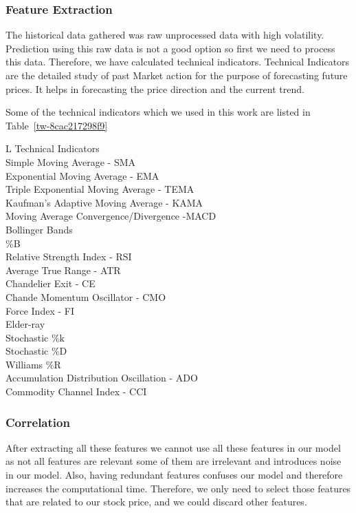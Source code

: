 \documentclass[5p,,preprint,12pt,twocolumn]{elsarticle}
\def\tblbottomrule{\noalign{\vspace*{6pt}}\hline\noalign{\vspace*{2pt}}}
\def\tblmidrule{\noalign{\vspace*{6pt}}\hline\noalign{\vspace*{2pt}}}
\begin{document}
\subsubsection{Feature Extraction}The historical data gathered was raw unprocessed data with high volatility. Prediction using this raw data is not a good option so first we need to process this data. Therefore, we have calculated technical indicators. Technical Indicators are the detailed study of past Market action for the purpose of forecasting future prices. It helps in forecasting the price direction and the current trend.

Some of the technical indicators which we used in this work are listed in Table~\ref{tw-8cac217298f9}
\begin{table}[!htbp]
\caption{{Technical Indicators} }
\label{tw-8cac217298f9}
\def\arraystretch{1}
\ignorespaces 
\centering 
\begin{tabulary}{\linewidth}{L}
\hline 
Technical Indicators\\
\tblmidrule 
Simple Moving Average - SMA\\
Exponential Moving Average - EMA\\
Triple Exponential Moving Average - TEMA\\
Kaufman's Adaptive Moving Average - KAMA\\
Moving Average Convergence/Divergence -MACD\\
Bollinger Bands\\
\%B\\
Relative Strength Index - RSI \\
 Average True Range - ATR\\
Chandelier Exit - CE\\
Chande Momentum Oscillator - CMO\\
Force Index - FI\\
Elder-ray\\
Stochastic \%k\\
Stochastic \%D\\
Williams \%R\\
Accumulation Distribution Oscillation - ADO\\
Commodity Channel Index - CCI\\
\tblbottomrule 
\end{tabulary}\par 
\end{table}




\subsubsection{Correlation}After extracting all these features we cannot use all these features in our model as not all features are relevant some of them are irrelevant and introduces noise in our model. Also, having redundant features confuses our model and therefore increases the computational time. Therefore, we only need to select those features that are related to our stock price, and we could discard other features.
\end{document}
